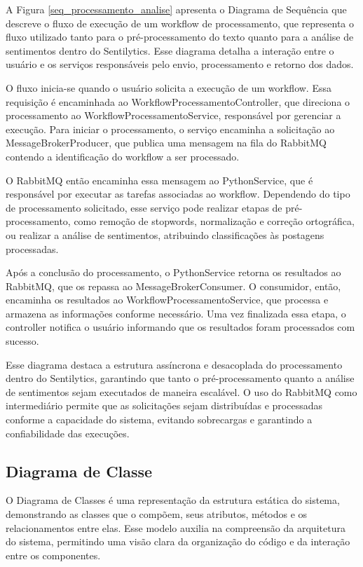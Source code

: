\documentclass[
	12pt,				%
	oneside,			%
	a4paper,			%
	english,			%
	french,				%
	spanish,			%
	brazil				%
	]{abntex2}
\begin{document}
A Figura \ref{seq_processamento_analise} apresenta o Diagrama de
Sequência que descreve o fluxo de execução de um workflow de
processamento, que representa o fluxo utilizado tanto para o
pré-processamento do texto quanto para a análise de sentimentos dentro
do Sentilytics. Esse diagrama detalha a interação entre o usuário e os
serviços responsáveis pelo envio, processamento e retorno dos dados.

O fluxo inicia-se quando o usuário solicita a execução de um workflow.
Essa requisição é encaminhada ao WorkflowProcessamentoController, que
direciona o processamento ao WorkflowProcessamentoService, responsável
por gerenciar a execução. Para iniciar o processamento, o serviço
encaminha a solicitação ao MessageBrokerProducer, que publica uma
mensagem na fila do RabbitMQ contendo a identificação do workflow a ser
processado.

O RabbitMQ então encaminha essa mensagem ao PythonService, que é
responsável por executar as tarefas associadas ao workflow. Dependendo
do tipo de processamento solicitado, esse serviço pode realizar etapas
de pré-processamento, como remoção de stopwords, normalização e correção
ortográfica, ou realizar a análise de sentimentos, atribuindo
classificações às postagens processadas.

Após a conclusão do processamento, o PythonService retorna os resultados
ao RabbitMQ, que os repassa ao MessageBrokerConsumer. O consumidor,
então, encaminha os resultados ao WorkflowProcessamentoService, que
processa e armazena as informações conforme necessário. Uma vez
finalizada essa etapa, o controller notifica o usuário informando que os
resultados foram processados com sucesso.

Esse diagrama destaca a estrutura assíncrona e desacoplada do
processamento dentro do Sentilytics, garantindo que tanto o
pré-processamento quanto a análise de sentimentos sejam executados de
maneira escalável. O uso do RabbitMQ como intermediário permite que as
solicitações sejam distribuídas e processadas conforme a capacidade do
sistema, evitando sobrecargas e garantindo a confiabilidade das
execuções.

\hypertarget{diagrama-de-classe}{%
\subsection{Diagrama de Classe}\label{diagrama-de-classe}}

O Diagrama de Classes é uma representação da estrutura estática do
sistema, demonstrando as classes que o compõem, seus atributos, métodos
e os relacionamentos entre elas. Esse modelo auxilia na compreensão da
arquitetura do sistema, permitindo uma visão clara da organização do
código e da interação entre os componentes.
\end{document}
